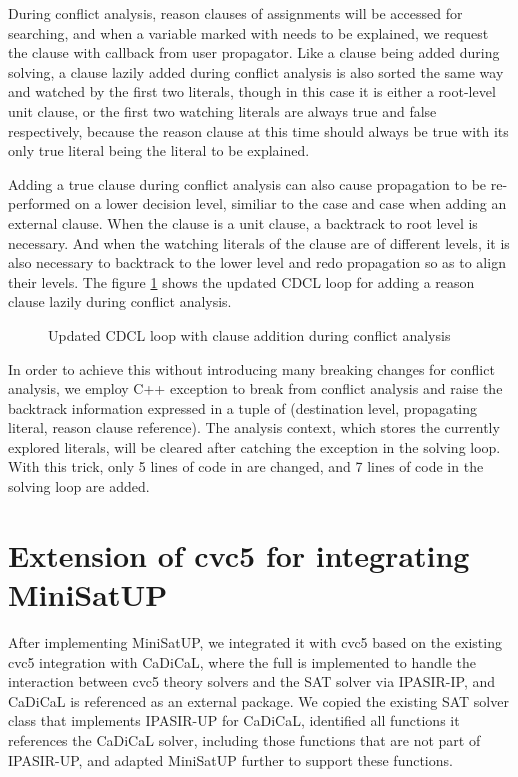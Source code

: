 During conflict analysis, reason clauses of assignments will be accessed for searching, and when a variable marked with  needs to be explained, we request the clause with callback  from user propagator. Like a clause being added during solving, a clause lazily added during conflict analysis is also sorted the same way and watched by the first two literals, though in this case it is either a root-level unit clause, or the first two watching literals are always true and false respectively, because the reason clause at this time should always be true with its only true literal being the literal to be explained.

Adding a true clause during conflict analysis can also cause propagation to be re-performed on a lower decision level, similiar to the  case and  case when adding an external clause. When the clause is a unit clause, a backtrack to root level is necessary. And when the watching literals of the clause are of different levels, it is also necessary to backtrack to the lower level and redo propagation so as to align their levels. The figure \ref{fig:analyze} shows the updated CDCL loop for adding a reason clause lazily during conflict analysis.

\begin{figure}[h!]
  \centering
  
  \caption{Updated CDCL loop with clause addition during conflict analysis}
  \label{fig:analyze}
\end{figure}

In order to achieve this without introducing many breaking changes for conflict analysis, we employ C++ exception to break from conflict analysis and raise the backtrack information expressed in a tuple of (destination level, propagating literal, reason clause reference). The analysis context, which stores the currently explored literals, will be cleared after catching the exception in the solving loop. With this trick, only 5 lines of code in  are changed, and 7 lines of code in the solving loop are added.

\section{Extension of cvc5 for integrating MiniSatUP}

After implementing MiniSatUP, we integrated it with cvc5 based on the existing cvc5 integration with CaDiCaL, where the full  is implemented to handle the interaction between cvc5 theory solvers and the SAT solver via IPASIR-IP, and CaDiCaL is referenced as an external package. We copied the existing SAT solver class that implements IPASIR-UP for CaDiCaL, identified all functions it references the CaDiCaL solver, including those functions that are not part of IPASIR-UP, and adapted MiniSatUP further to support these functions.

